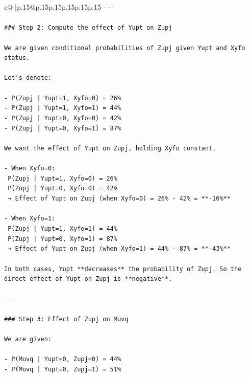 \documentclass{article}
\begin{document}
{\begin{supertabular}{c@{$\;$}|p{.15\linewidth}@{}p{.15\linewidth}p{.15\linewidth}p{.15\linewidth}p{.15\linewidth}p{.15\linewidth}}
{{{\texttt{{-}{-}{-}} \\
\\ 
\texttt{\#\#\# Step 2: Compute the effect of Yupt on Zupj} \\
\\ 
\texttt{We are given conditional probabilities of Zupj given Yupt and Xyfo status.} \\
\\ 
\texttt{Let’s denote:} \\
\\ 
\texttt{{-} P(Zupj | Yupt=1, Xyfo=0) = 26\%} \\
\texttt{{-} P(Zupj | Yupt=1, Xyfo=1) = 44\%} \\
\texttt{{-} P(Zupj | Yupt=0, Xyfo=0) = 42\%} \\
\texttt{{-} P(Zupj | Yupt=0, Xyfo=1) = 87\%} \\
\\ 
\texttt{We want the effect of Yupt on Zupj, holding Xyfo constant.} \\
\\ 
\texttt{{-} When Xyfo=0:  } \\
\texttt{  P(Zupj | Yupt=1, Xyfo=0) = 26\%  } \\
\texttt{  P(Zupj | Yupt=0, Xyfo=0) = 42\%  } \\
\texttt{  → Effect of Yupt on Zupj (when Xyfo=0) = 26\% {-} 42\% = **{-}16\%**} \\
\\ 
\texttt{{-} When Xyfo=1:  } \\
\texttt{  P(Zupj | Yupt=1, Xyfo=1) = 44\%  } \\
\texttt{  P(Zupj | Yupt=0, Xyfo=1) = 87\%  } \\
\texttt{  → Effect of Yupt on Zupj (when Xyfo=1) = 44\% {-} 87\% = **{-}43\%**} \\
\\ 
\texttt{In both cases, Yupt **decreases** the probability of Zupj. So the direct effect of Yupt on Zupj is **negative**.} \\
\\ 
\texttt{{-}{-}{-}} \\
\\ 
\texttt{\#\#\# Step 3: Effect of Zupj on Muvq} \\
\\ 
\texttt{We are given:} \\
\\ 
\texttt{{-} P(Muvq | Yupt=0, Zupj=0) = 44\%} \\
\texttt{{-} P(Muvq | Yupt=0, Zupj=1) = 51\%} \\
}}}
\end{supertabular}}
\end{document}
